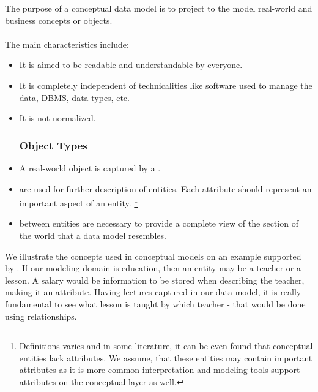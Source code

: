 The purpose of a conceptual data model is to project to the model real-world and business concepts or objects. \\ \\
The main characteristics include: 
\begin{itemize}
	\item It is aimed to be readable and understandable by everyone.
	\item It is completely independent of technicalities like software used to manage the data, DBMS, data types, etc.
	\item It is not normalized.
	\subsubsection{Object Types}
	\item A real-world object is captured by a .
	\item {} are used for further description of entities. 
	Each attribute should represent an important aspect of an entity. \footnote{Definitions varies and in some literature, it can be even found that conceptual entities lack attributes. We assume, that these entities may contain important attributes as it is more common interpretation and modeling tools support attributes on the conceptual layer as well.} 
	\item {} between entities are necessary to provide a complete view of the section of the world that a data model resembles.
\end{itemize}

We illustrate the concepts used in conceptual models on an example supported by .
If our modeling domain is education, then an entity may be a teacher or a lesson. 
A salary would be information to be stored when describing the teacher, making it an attribute.
Having lectures captured in our data model, it is really fundamental to see what lesson is taught by which teacher - that would be done using relationships.


